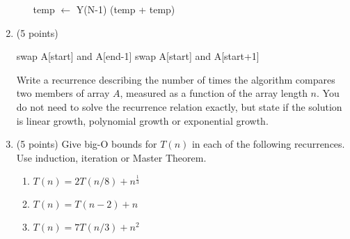 \documentclass[12pt]{report}
\begin{document}
\begin{enumerate}[label=\arabic*.]
\begin{enumerate}[label=\arabic{enumi}\alph*)]
\begin{algorithm}[H]
\begin{algorithmic}[1]
				\Else{}
					\State temp $\gets$ Y(N-1)
					\State \Return (temp + temp)
				\EndIf
			\EndFunction
			\end{algorithmic}
		\end{algorithm}
	\end{enumerate}
	\item (5 points)
		\begin{algorithm}[H]
			\label{alg:7a}  %
			\begin{algorithmic}[1]
					\Return
				\EndIf
					\State swap A[start] and A[end-1]
				\EndIf
				\State {}
					\State swap A[start] and A[start+1]
				\EndIf
				\State {}
			\EndFunction
			\end{algorithmic}
		\end{algorithm}
		Write a recurrence describing the number of times the algorithm compares two members of array $A$, measured as a function of the array length $n$. You do not need to solve the recurrence relation exactly, but state if the solution is linear growth, polynomial growth or exponential growth.
	\item (5 points) Give big-O bounds for $T(n)$ in each of the following recurrences. Use induction, iteration or Master Theorem.
	\begin{enumerate}[label=\arabic{enumi}\alph*)]
	    \item $T(n)=2T(n/8)+n^{\frac{1}{3}}$
	    \item $T(n)=T(n-2)+n$
	    \item $T(n)=7T(n/3)+n^{2}$
	\end{enumerate}
\end{enumerate}
\end{document}
